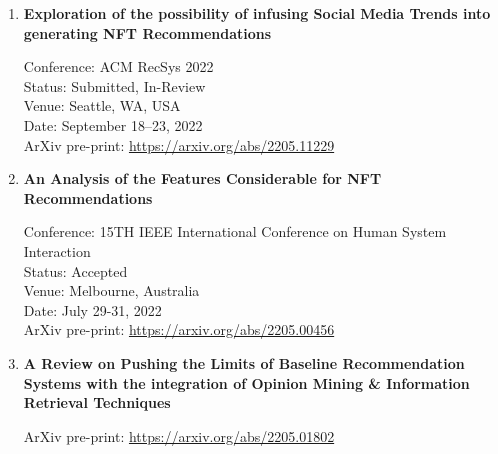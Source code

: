 \begin{enumerate}
\item \textbf{Exploration of the possibility of infusing Social Media Trends into generating NFT Recommendations}

Conference: ACM RecSys 2022 \\
Status: Submitted, In-Review \\
Venue: Seattle, WA, USA \\
Date: September 18–23, 2022 \\
ArXiv pre-print: \url{https://arxiv.org/abs/2205.11229} \\

\item \textbf{An Analysis of the Features Considerable for NFT Recommendations}

Conference: 15TH IEEE International Conference on Human System Interaction \\
Status: Accepted \\
Venue: Melbourne, Australia\\
Date: July 29-31, 2022 \\
ArXiv pre-print: \url{https://arxiv.org/abs/2205.00456} \\

\item \textbf{A Review on Pushing the Limits of Baseline Recommendation Systems with the integration of Opinion Mining \& Information Retrieval Techniques}

ArXiv pre-print: \url{https://arxiv.org/abs/2205.01802} \\

\end{enumerate}
